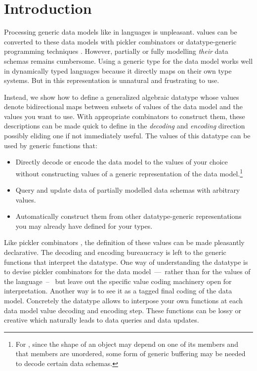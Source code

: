 \documentclass[nolinenum]{jfp}
\begin{document}
\maketitle[F]
\section{Introduction}

Processing generic data models like \json{} in \ml{} languages is
unpleasant. \ml{} values can be converted to these data models with
pickler combinators \citep{picklers} or datatype-generic programming
techniques \citep{datatypegeneric}. However, partially or fully
modelling \emph{their} data schemas remains cumbersome. Using a
generic type for the data model works well in dynamically typed
languages because it directly maps on their own type systems. But in
\ml{} this representation is unnatural and frustrating to use.

Instead, we show how to define a generalized algebraic datatype whose
values denote bidirectional maps between subsets of values of the data
model and the \ml{} values you want to use. With appropriate
combinators to construct them, these descriptions can be made quick to
define in the \emph{decoding} and \emph{encoding} direction possibly
eliding one if not immediately useful. The values of this datatype can
be used by generic functions that:

\begin{itemize}
\item Directly decode or encode the data model to the \ml{} values of
  your choice without constructing values of a generic
  representation of the data model.\footnote{For
  \json{}, since the shape of an object may depend on one of its
  members and that members are unordered, some form of generic
  buffering may be needed to decode certain data schemas.}
\item Query and update data of partially modelled data schemas with
  arbitrary \ml{} values.
\item Automatically construct them from other datatype-generic
  representations you may already have defined for your \ml{} types.
\end{itemize}

Like pickler combinators \citep{picklers}, the definition of these
values can be made pleasantly declarative. The decoding and encoding
bureaucracy is left to the generic functions that interpret the
datatype. One way of understanding the datatype is to devise pickler
combinators for the data model~––~rather than for the values of the
\ml{} language~--~ but leave out the specific value coding machinery
open for interpretation. Another way is to see it as a tagged final
coding of the data model. Concretely the datatype allows to interpose
your own functions at each data model value decoding and encoding
step. These functions can be lossy or creative which naturally leads
to data queries and data updates.
\end{document}
